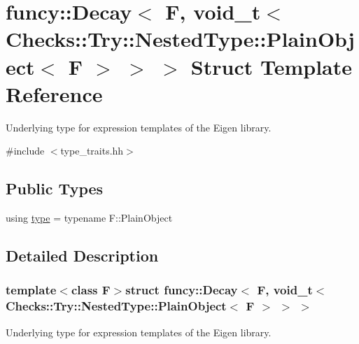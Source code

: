 \hypertarget{structfuncy_1_1Decay_3_01F_00_01void__t_3_01Checks_1_1Try_1_1NestedType_1_1PlainObject_3_01F_01_4_01_4_01_4}{\section{funcy\-:\-:Decay$<$ F, void\-\_\-t$<$ Checks\-:\-:Try\-:\-:Nested\-Type\-:\-:Plain\-Object$<$ F $>$ $>$ $>$ Struct Template Reference}
\label{structfuncy_1_1Decay_3_01F_00_01void__t_3_01Checks_1_1Try_1_1NestedType_1_1PlainObject_3_01F_01_4_01_4_01_4}
}


Underlying type for expression templates of the Eigen library.  




{\ttfamily \#include $<$type\-\_\-traits.\-hh$>$}

\subsection*{Public Types}
\begin{DoxyCompactItemize}
\item 
using \hyperlink{structfuncy_1_1Decay_3_01F_00_01void__t_3_01Checks_1_1Try_1_1NestedType_1_1PlainObject_3_01F_01_4_01_4_01_4_abe1451b1bf490b74b1aeb260417d7373}{type} = typename F\-::\-Plain\-Object
\end{DoxyCompactItemize}


\subsection{Detailed Description}
\subsubsection*{template$<$class F$>$struct funcy\-::\-Decay$<$ F, void\-\_\-t$<$ Checks\-::\-Try\-::\-Nested\-Type\-::\-Plain\-Object$<$ F $>$ $>$ $>$}

Underlying type for expression templates of the Eigen library. 

